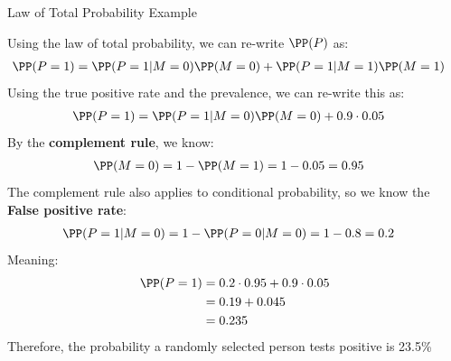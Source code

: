 \documentclass[compress, 8pt]{beamer}
\begin{document}
\begin{frame}{Law of Total Probability Example}

Using the law of total probability, we can re-write $\PP (P)$ as:
\begin{align*}
    \PP (P = 1) &= \PP (P = 1 \vert M = 0 ) \PP (M = 0) + \PP (P = 1 \vert M = 1) \PP (M=1)
\end{align*}
Using the true positive rate and the prevalence, we can re-write this as:
\begin{align*}
    \PP (P = 1) &= \PP (P = 1 \vert M = 0 ) \PP (M = 0) + 0.9 \cdot 0.05
\end{align*}
By the \textbf{complement rule}, we know:
\begin{align*}
    \PP (M = 0) &= 1 - \PP (M = 1) = 1 - 0.05 = 0.95
\end{align*}
The complement rule also applies to conditional probability, so we know the \textbf{False positive rate}:
\begin{align*}
    \PP (P = 1 \vert M = 0 ) &= 1 - \PP (P = 0 \vert M = 0) = 1 - 0.8 = 0.2
\end{align*}
Meaning:
\begin{align*}
    \PP (P = 1) &= 0.2 \cdot 0.95 + 0.9 \cdot 0.05 \\
    &= 0.19 + 0.045 \\
    &= 0.235
\end{align*}
Therefore, the probability a randomly selected person tests positive is 23.5\%

\end{frame}
\end{document}
